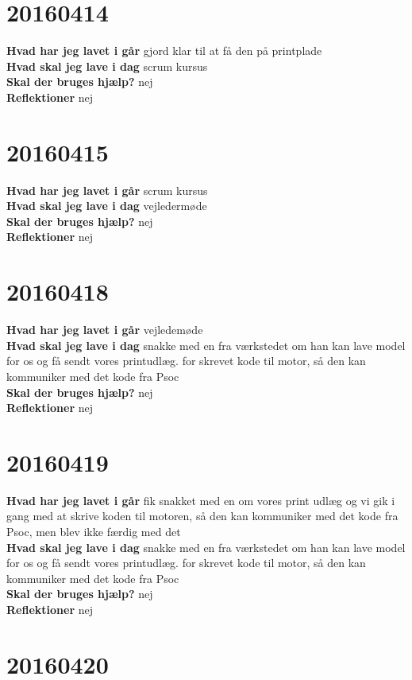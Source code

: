 \documentclass{article}
\begin{document}
	\section{20160414}
	
	\textbf{Hvad har jeg lavet i går}
	gjord klar til at få den på printplade
	\\
	\textbf{Hvad skal jeg lave i dag}
scrum kursus
	\\
	\textbf{Skal der bruges hjælp?}
	nej
	\\
	\textbf{Reflektioner}
	nej
\section{20160415}
	
\textbf{Hvad har jeg lavet i går}
scrum kursus
\\
\textbf{Hvad skal jeg lave i dag}
vejledermøde
\\
\textbf{Skal der bruges hjælp?}
nej
\\
\textbf{Reflektioner}
nej	
\section{20160418}

\textbf{Hvad har jeg lavet i går}
vejledemøde
\\
\textbf{Hvad skal jeg lave i dag}
snakke med en fra værkstedet om han kan lave model for os og få sendt vores printudlæg.
for skrevet kode til motor, så den kan kommuniker med det kode fra Psoc
\\
\textbf{Skal der bruges hjælp?}
nej
\\
\textbf{Reflektioner}
nej	

\section{20160419}

\textbf{Hvad har jeg lavet i går}
fik snakket med en om vores print udlæg og vi gik i gang med at skrive koden til motoren,  så den kan kommuniker med det kode fra Psoc, men blev ikke færdig med det
\\
\textbf{Hvad skal jeg lave i dag}
snakke med en fra værkstedet om han kan lave model for os og få sendt vores printudlæg.
for skrevet kode til motor, så den kan kommuniker med det kode fra Psoc
\\
\textbf{Skal der bruges hjælp?}
nej
\\
\textbf{Reflektioner}
nej		
	

\section{20160420}
\end{document}
